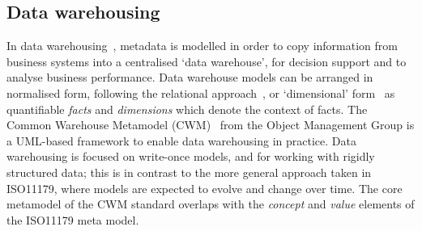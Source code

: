 
\subsection{Data warehousing}

In data warehousing~\cite{kim02}, metadata is modelled in order to copy
information from business systems into a centralised `data warehouse',
for decision support and to analyse business performance. Data
warehouse models can be arranged in normalised form, following the
relational approach~\cite{inm92}, or `dimensional' form~\cite{kim02}
as quantifiable \emph{facts} and \emph{dimensions} which denote the
context of facts. The Common Warehouse Metamodel (CWM)~\cite{poole03}
from the Object Management Group is a UML-based framework to enable
data warehousing in practice. Data warehousing is focused on
write-once models, and for working with rigidly structured data; this
is in contrast to the more general approach taken in ISO11179, where
models are expected to evolve and change over time. 
The core metamodel of the CWM standard overlaps with the 
\emph{concept} and \emph{value} elements of the ISO11179 meta model.

